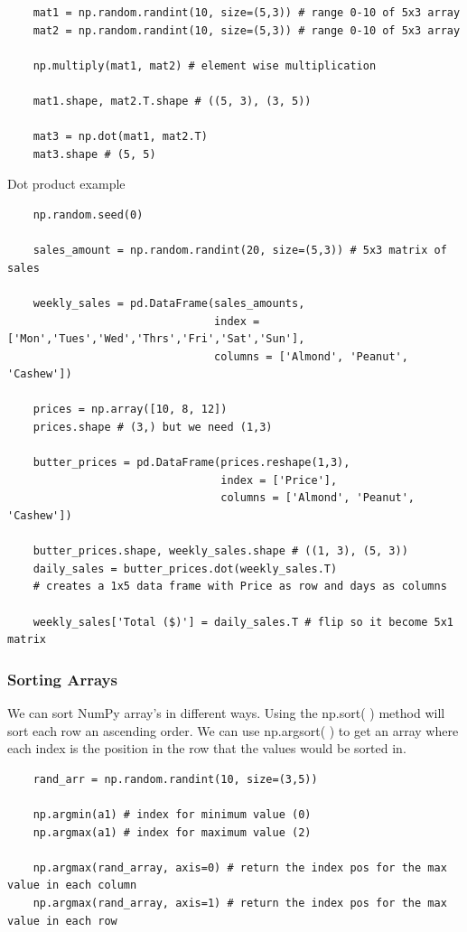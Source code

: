 \documentclass[11pt, a4paper]{article}
\begin{document}
\begin{spacing}{1.1}
\begin{lstlisting}
	mat1 = np.random.randint(10, size=(5,3)) # range 0-10 of 5x3 array
	mat2 = np.random.randint(10, size=(5,3)) # range 0-10 of 5x3 array
	
	np.multiply(mat1, mat2) # element wise multiplication
	
	mat1.shape, mat2.T.shape # ((5, 3), (3, 5))
	
	mat3 = np.dot(mat1, mat2.T)
	mat3.shape # (5, 5)	\end{lstlisting} \newpage

	\noindent Dot product example 
	\begin{lstlisting}
	np.random.seed(0)
	
	sales_amount = np.random.randint(20, size=(5,3)) # 5x3 matrix of sales
	
	weekly_sales = pd.DataFrame(sales_amounts,
	                            index = ['Mon','Tues','Wed','Thrs','Fri','Sat','Sun'],
	                            columns = ['Almond', 'Peanut', 'Cashew'])
	                            
	prices = np.array([10, 8, 12])     
	prices.shape # (3,) but we need (1,3)
	
	butter_prices = pd.DataFrame(prices.reshape(1,3),
	                             index = ['Price'],
	                             columns = ['Almond', 'Peanut', 'Cashew'])  
	                                                 
	butter_prices.shape, weekly_sales.shape # ((1, 3), (5, 3))
	daily_sales = butter_prices.dot(weekly_sales.T)
	# creates a 1x5 data frame with Price as row and days as columns
	
	weekly_sales['Total ($)'] = daily_sales.T # flip so it become 5x1 matrix \end{lstlisting} \vspace*{1mm} 
	\subsubsection{Sorting Arrays}
	We can sort NumPy array's in different ways. Using the np.sort( ) method will sort each row an ascending order. We can use np.argsort( ) to get an array where each index is the position in the row that the values would be sorted in.  	
	\begin{lstlisting}
	rand_arr = np.random.randint(10, size=(3,5)) 	
	
	np.argmin(a1) # index for minimum value (0)
	np.argmax(a1) # index for maximum value (2)
	
	np.argmax(rand_array, axis=0) # return the index pos for the max value in each column
	np.argmax(rand_array, axis=1) # return the index pos for the max value in each row \end{lstlisting} \vspace*{1mm} 

\end{spacing}
\end{document}
